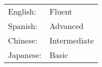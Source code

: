 \\
\begin{tabular}{ll}
  English: & Fluent\\
  Spanish: & Advanced\\
  Chinese: & Intermediate\\
  Japanese: & Basic
\end{tabular}